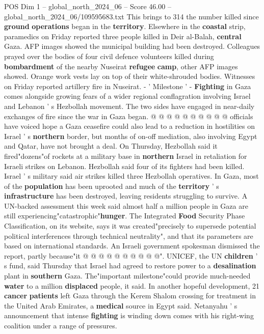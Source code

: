 \begin{textsample}{POS Dim 1 – global\_north\_2024\_06 – Score 46.00 – global\_north\_2024\_06/109595683.txt}
This brings to 314 the number killed since \textbf{ground} \textbf{operations} began in the \textbf{territory}.
Elsewhere in the \textbf{coastal} strip, paramedics on Friday reported three people killed in Deir al-Balah, \textbf{central} Gaza.
AFP images showed the municipal building had been destroyed.
Colleagues prayed over the bodies of four civil defence volunteers killed during \textbf{bombardment} of the nearby Nuseirat \textbf{refugee} \textbf{camp}, other AFP images showed.
Orange work vests lay on top of their white-shrouded bodies.
Witnesses on Friday reported artillery fire in Nuseirat. - ' Milestone ' - \textbf{Fighting} in Gaza comes alongside growing fears of a wider regional conflagration involving Israel and Lebanon ' s Hezbollah movement.
The two sides have engaged in near-daily exchanges of fire since the war in Gaza began. @ @ @ @ @ @ @ @ @ @ officials have voiced hope a Gaza ceasefire could also lead to a reduction in hostilities on Israel ' s \textbf{northern} border, but months of on-off mediation, also involving Egypt and Qatar, have not brought a deal.
On Thursday, Hezbollah said it fired"dozens"of rockets at a military base in \textbf{northern} Israel in retaliation for Israeli strikes on Lebanon.
Hezbollah said four of its fighters had been killed.
Israel ' s military said air strikes killed three Hezbollah operatives.
In Gaza, most of the \textbf{population} has been uprooted and much of the \textbf{territory} ' s \textbf{infrastructure} has been destroyed, leaving residents struggling to survive.
A UN-backed assessment this week said almost half a million people in Gaza are still experiencing"catastrophic"\textbf{hunger}.
The Integrated \textbf{Food} Security Phase Classification, on its website, says it was created"precisely to supersede potential political interferences through technical neutrality", and that its parameters are based on international standards.
An Israeli government spokesman dismissed the report, partly because"it @ @ @ @ @ @ @ @ @ @".
UNICEF, the UN \textbf{children} ' s fund, said Thursday that Israel had agreed to restore power to a \textbf{desalination} plant in \textbf{southern} Gaza.
The"important milestone"could provide much-needed \textbf{water} to a million \textbf{displaced} people, it said.
In another hopeful development, 21 \textbf{cancer} \textbf{patients} left Gaza through the Kerem Shalom crossing for treatment in the United Arab Emirates, a \textbf{medical} source in Egypt said.
Netanyahu ' s announcement that intense \textbf{fighting} is winding down comes with his right-wing coalition under a range of pressures.

\end{textsample}
